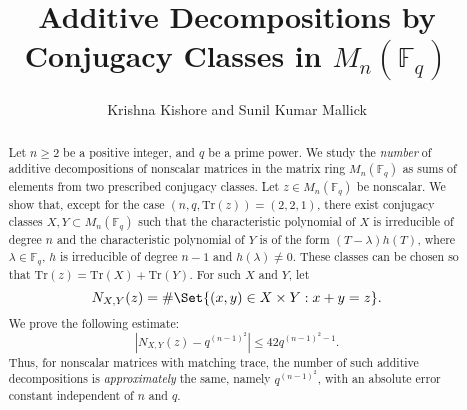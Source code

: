 \documentclass[preprint,11pt]{amsart}
\def\F{\mathbb{F}}
\theoremstyle{definition}
\numberwithin{thm}{section}
\newcommand{\tit}[1]{\textit{#1}}
\def\F{\mathbb{F}}
\newcommand{\tr}{\textrm{Tr}}
\newcommand{\sub}{\subset}
\begin{document}
\title{Additive Decompositions by Conjugacy Classes in $M_n(\mathbb{F}_q)$}



\begin{abstract}
Let $n \geq 2$ be a positive integer, and $q$ be a prime power.  We study the \tit{number} of additive decompositions of nonscalar matrices in the matrix ring $M_n(\F_q)$ as sums of elements from two prescribed conjugacy classes. Let $z \in M_n(\F_q)$ be nonscalar. We show that, except for the case $(n,q,\tr(z)) = (2,2,1)$, there exist conjugacy classes $X, Y  \sub M_n(\F_q)$ such that the characteristic polynomial of $X$ is irreducible of degree $n$ and the characteristic polynomial of $Y$ is of the form $ (T- \lambda) h(T)$, where $\lambda \in \F_q$, $h$ is irreducible of degree $n-1$ and $h(\lambda) \neq 0$. These classes can be chosen so that $\tr(z) = \tr(X) + \tr(Y)$. For such $X$ and $Y$, let 
$$
N_{X,Y}(z) = \# \Set{ (x,y) \in X \times Y : x + y = z}.
$$
We prove the following estimate:
$$
\left| N_{X,Y}(z) - q^{(n-1)^2}  \right| \leq 42 q^{(n-1)^2 -1}.
$$
Thus, for nonscalar matrices with matching trace, the number of such additive decompositions is \tit{approximately} the same, namely $q^{(n-1)^2}$,  with an absolute error constant independent of $n$ and $q$.
\end{abstract}




\author{Krishna Kishore and Sunil Kumar Mallick}





\address{Krishna Kishore,
Department of Mathematics and Statistics,
Indian Institute of Technology Tirupati,
Tirupati, Andhra Pradesh
India, 517619.}





\address{Sunil Kumar Mallick,
Department of Mathematics and Statistics,
Indian Institute of Technology Tirupati,
Tirupati, Andhra Pradesh
India, 517619.}



\end{document}
